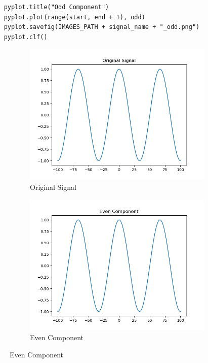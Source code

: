 \documentclass[10pt,a4paper, margin=1in]{article}
\begin{document}
\begin{enumerate}
\begin{enumerate}
\begin{verbatim}
    pyplot.title("Odd Component")
    pyplot.plot(range(start, end + 1), odd)
    pyplot.savefig(IMAGES_PATH + signal_name + "_odd.png")
    pyplot.clf()
\end{verbatim}
\begin{figure}[h]
    \centering
    \begin{subfigure}[t]{0.3\linewidth}
    \centering
        \caption{Original Signal}
        \includegraphics[width=1\linewidth]{assets/q7a/sine_part_a_original.png}
    \end{subfigure}
    \begin{subfigure}[t]{0.3\linewidth}
    \centering
        \caption{Even Component}
        \includegraphics[width=1\linewidth]{assets/q7a/sine_part_a_even.png}

\end{subfigure}
\end{figure}
\end{enumerate}
\end{enumerate}
\end{document}
